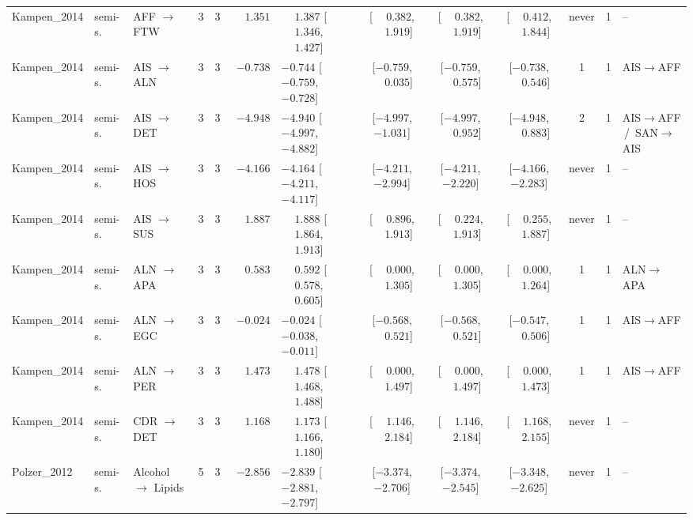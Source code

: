 \begin{landscape}
\begin{longtable}{@{}llp{2.15cm}ccrl cccc c l@{}}
Kampen\_2014 & semi-s. & AFF $\to$ FTW & 3 & 3 & $\phantom{-}1.351$ & $\phantom{-}1.387$ [$\phantom{-}1.346$, $\phantom{-}1.427$] & [$\phantom{-}0.382$, $\phantom{-}1.919$] & [$\phantom{-}0.382$, $\phantom{-}1.919$] & [$\phantom{-}0.412$, $\phantom{-}1.844$] & never & 1 & -- \\
Kampen\_2014 & semi-s. & AIS $\to$ ALN & 3 & 3 & $-0.738$ & $-0.744$ [$-0.759$, $-0.728$] & [$-0.759$, $\phantom{-}0.035$] & [$-0.759$, $\phantom{-}0.575$] & [$-0.738$, $\phantom{-}0.546$] & 1 & 1 & AIS$\to$AFF \\
Kampen\_2014 & semi-s. & AIS $\to$ DET & 3 & 3 & $-4.948$ & $-4.940$ [$-4.997$, $-4.882$] & [$-4.997$, $-1.031$] & [$-4.997$, $\phantom{-}0.952$] & [$-4.948$, $\phantom{-}0.883$] & 2 & 1 & AIS$\to$AFF \,/\, SAN$\to$AIS \\
Kampen\_2014 & semi-s. & AIS $\to$ HOS & 3 & 3 & $-4.166$ & $-4.164$ [$-4.211$, $-4.117$] & [$-4.211$, $-2.994$] & [$-4.211$, $-2.220$] & [$-4.166$, $-2.283$] & never & 1 & -- \\
Kampen\_2014 & semi-s. & AIS $\to$ SUS & 3 & 3 & $\phantom{-}1.887$ & $\phantom{-}1.888$ [$\phantom{-}1.864$, $\phantom{-}1.913$] & [$\phantom{-}0.896$, $\phantom{-}1.913$] & [$\phantom{-}0.224$, $\phantom{-}1.913$] & [$\phantom{-}0.255$, $\phantom{-}1.887$] & never & 1 & -- \\
Kampen\_2014 & semi-s. & ALN $\to$ APA & 3 & 3 & $\phantom{-}0.583$ & $\phantom{-}0.592$ [$\phantom{-}0.578$, $\phantom{-}0.605$] & [$\phantom{-}0.000$, $\phantom{-}1.305$] & [$\phantom{-}0.000$, $\phantom{-}1.305$] & [$\phantom{-}0.000$, $\phantom{-}1.264$] & 1 & 1 & ALN$\to$APA \\
Kampen\_2014 & semi-s. & ALN $\to$ EGC & 3 & 3 & $-0.024$ & $-0.024$ [$-0.038$, $-0.011$] & [$-0.568$, $\phantom{-}0.521$] & [$-0.568$, $\phantom{-}0.521$] & [$-0.547$, $\phantom{-}0.506$] & 1 & 1 & AIS$\to$AFF \\
Kampen\_2014 & semi-s. & ALN $\to$ PER & 3 & 3 & $\phantom{-}1.473$ & $\phantom{-}1.478$ [$\phantom{-}1.468$, $\phantom{-}1.488$] & [$\phantom{-}0.000$, $\phantom{-}1.497$] & [$\phantom{-}0.000$, $\phantom{-}1.497$] & [$\phantom{-}0.000$, $\phantom{-}1.473$] & 1 & 1 & AIS$\to$AFF \\
Kampen\_2014 & semi-s. & CDR $\to$ DET & 3 & 3 & $\phantom{-}1.168$ & $\phantom{-}1.173$ [$\phantom{-}1.166$, $\phantom{-}1.180$] & [$\phantom{-}1.146$, $\phantom{-}2.184$] & [$\phantom{-}1.146$, $\phantom{-}2.184$] & [$\phantom{-}1.168$, $\phantom{-}2.155$] & never & 1 & -- \\
Polzer\_2012 & semi-s. & Alcohol $\to$ Lipids & 5 & 3 & $-2.856$ & $-2.839$ [$-2.881$, $-2.797$] & [$-3.374$, $-2.706$] & [$-3.374$, $-2.545$] & [$-3.348$, $-2.625$] & never & 1 & -- \\

\end{longtable}
\end{landscape}
